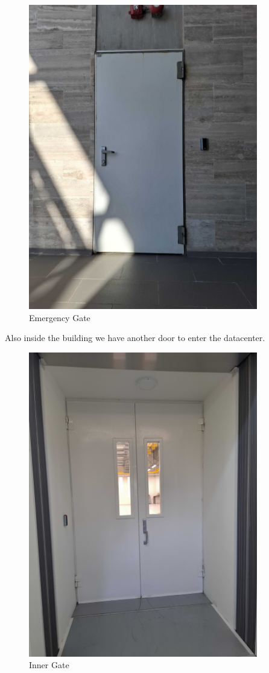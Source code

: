   \newpage

  \begin{figure}
    \includegraphics[width=10cm]{17.jpg}
    \centering
    \caption*{Emergency Gate}
  \end{figure}

  \newpage

Also inside the building we have another door to enter the datacenter.

\begin{figure}
    \includegraphics[width=10cm]{18.jpg}
    \centering
    \caption*{Inner Gate}
  \end{figure}

